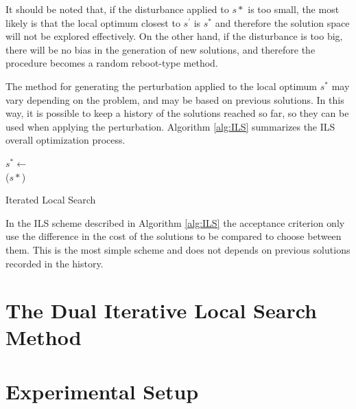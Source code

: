 \documentclass[review]{elsarticle}
\begin{document}
It should be noted that, if the disturbance applied to $s*$ is too small, the most likely is that the local optimum closest to $s^\prime$ is $s^*$ and therefore the solution space will not be explored effectively. On the other hand, if the disturbance is too big, there will be no bias in the generation of new solutions, and therefore the procedure becomes a random reboot-type method.


The method for generating the perturbation applied to the local optimum $s^*$ may vary depending on the problem, and may be based on previous solutions. In this way, it is possible to keep a history of the solutions reached so far, so they can be used when applying the perturbation. Algorithm \ref{alg:ILS} summarizes the ILS overall optimization process.

\begin{algorithm}
	\SetNlSkip{0.5em}
	\BlankLine
	$s^* \leftarrow$ \\
	\BlankLine
	\KwRet ($s*$)
	
	\caption{Iterated Local Search}\label{alg:ILS}
\end{algorithm}

In the ILS scheme described in Algorithm \ref{alg:ILS} the acceptance criterion only use the difference in the cost of the solutions to be compared to choose between them. This is the most simple scheme and does not depends on previous solutions recorded in the history.

\clearpage 

\section{The Dual Iterative Local Search Method}

\clearpage

\section{Experimental Setup} \label{sec:expSetup}
\end{document}

